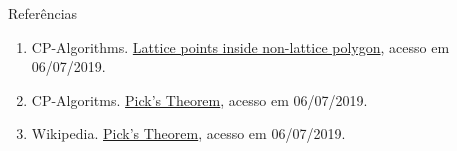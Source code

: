 \begin{frame}[fragile]{Referências}

    \begin{enumerate}

        \item CP-Algorithms. \href{https://cp-algorithms.com/geometry/lattice-points.html}{Lattice points inside non-lattice polygon}, acesso em 06/07/2019.

        \item CP-Algoritms. \href{https://cp-algorithms.com/geometry/picks-theorem.html}{Pick's Theorem}, acesso em 06/07/2019.

        \item Wikipedia. \href{https://en.wikipedia.org/wiki/Pick\%27s_theorem}{Pick's Theorem},
            acesso em 06/07/2019.


    \end{enumerate}

\end{frame}
